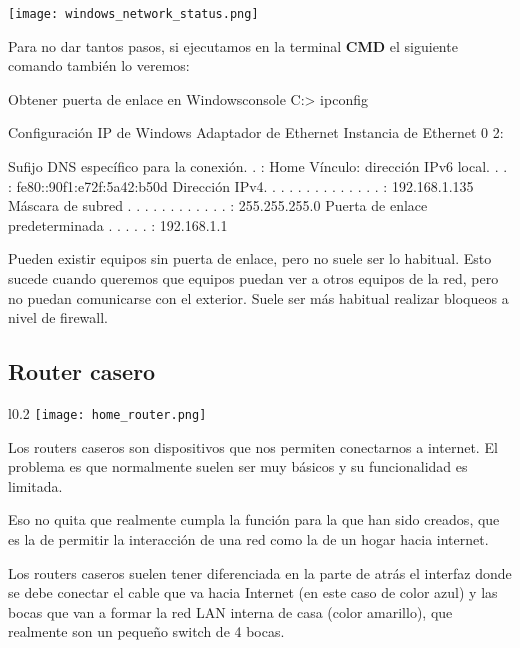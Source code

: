 \begin{center}
    \vspace{-15pt}
    \texttt{[image: windows\_network\_status.png]}
    \vspace{-15pt}
\end{center}

Para no dar tantos pasos, si ejecutamos en la terminal \textbf{CMD} el siguiente comando también lo veremos:

\begin{mycode}{Obtener puerta de enlace en Windows}{console}{}
C:\Users\ruben> ipconfig

Configuración IP de Windows
Adaptador de Ethernet Instancia de Ethernet 0 2:

Sufijo DNS específico para la conexión. . : Home
Vínculo: dirección IPv6 local. . . : fe80::90f1:e72f:5a42:b50d%
Dirección IPv4. . . . . . . . . . . . . . : 192.168.1.135
Máscara de subred . . . . . . . . . . . . : 255.255.255.0
Puerta de enlace predeterminada . . . . . : 192.168.1.1
\end{mycode}

Pueden existir equipos sin puerta de enlace, pero no suele ser lo habitual. Esto sucede cuando queremos que equipos puedan ver a otros equipos de la red, pero no puedan comunicarse con el exterior. Suele ser más habitual realizar bloqueos a nivel de firewall.

\subsection{Router casero}
\begin{wrapfigure}{l}{0.2\linewidth}
    \centering
    \vspace{-20pt}
    \texttt{[image: home\_router.png]}
    \vspace{-32pt}
\end{wrapfigure}
Los routers caseros son dispositivos que nos permiten conectarnos a internet. El problema es que normalmente suelen ser muy básicos y su funcionalidad es limitada.

Eso no quita que realmente cumpla la función para la que han sido creados, que es la de permitir la interacción de una red como la de un hogar hacia internet.

Los routers caseros suelen tener diferenciada en la parte de atrás el interfaz donde se debe conectar el cable que va hacia Internet (en este caso de color azul) y las bocas que van a formar la red LAN interna de casa (color amarillo), que realmente son un pequeño switch de 4 bocas.

